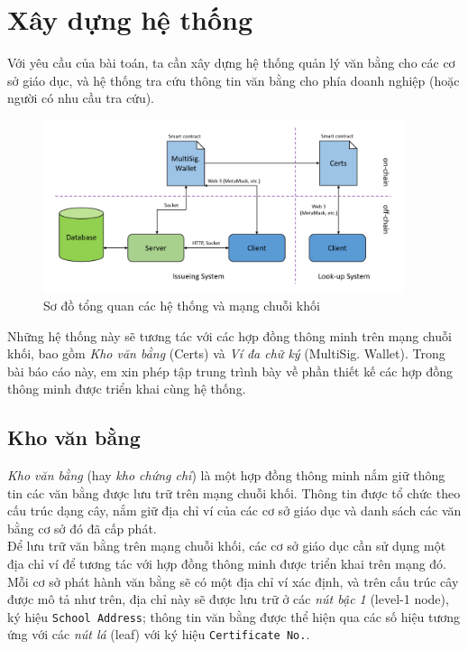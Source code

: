 \newpage
\section{Xây dựng hệ thống}

Với yêu cầu của bài toán, ta cần xây dựng hệ thống quản lý văn bằng cho các cơ sở giáo dục, và hệ thống tra cứu thông tin văn bằng cho phía doanh nghiệp (hoặc người có nhu cầu tra cứu).\\

\begin{figure}[ht]
    \centering
    \includegraphics[width=400px]{anh/giai-phap/system-overview.png}
    \caption{Sơ đồ tổng quan các hệ thống và mạng chuỗi khối}
    \label{images/system-overview}
\end{figure}

Những hệ thống này sẽ tương tác với các hợp đồng thông minh trên mạng chuỗi khối, bao gồm \textit{Kho văn bằng} (Certs) và \textit{Ví đa chữ ký} (MultiSig. Wallet). Trong bài báo cáo này, em xin phép tập trung trình bày về phần thiết kế các hợp đồng thông minh được triển khai cùng hệ thống.


\subsection{Kho văn bằng}
\textit{Kho văn bằng} (hay \textit{kho chứng chỉ}) là một hợp đồng thông minh nắm giữ thông tin các văn bằng được lưu trữ trên mạng chuỗi khối. Thông tin được tổ chức theo cấu trúc dạng cây, nắm giữ địa chỉ ví của các cơ sở giáo dục và danh sách các văn bằng cơ sở đó đã cấp phát.\\

Để lưu trữ văn bằng trên mạng chuỗi khối, các cơ sở giáo dục cần sử dụng một địa chỉ ví để tương tác với hợp đồng thông minh được triển khai trên mạng đó. Mỗi cơ sở phát hành văn bằng sẽ có một địa chỉ ví xác định, và trên cấu trúc cây được mô tả như trên, địa chỉ này sẽ được lưu trữ ở các \textit{nút bậc 1} (level-1 node), ký hiệu \texttt{School Address}; thông tin văn bằng được thể hiện qua các số hiệu tương ứng với các \textit{nút lá} (leaf) với ký hiệu \texttt{Certificate No.}.\\

